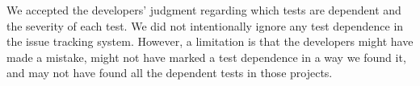 We accepted the developers' judgment regarding which tests are dependent
and the severity of each test.  We did not intentionally ignore
any test dependence in the issue tracking system.
However, a limitation is that the developers might have made a mistake,
might not have marked a test dependence in a way we found it, and may not
have found all the dependent tests in those projects. 



